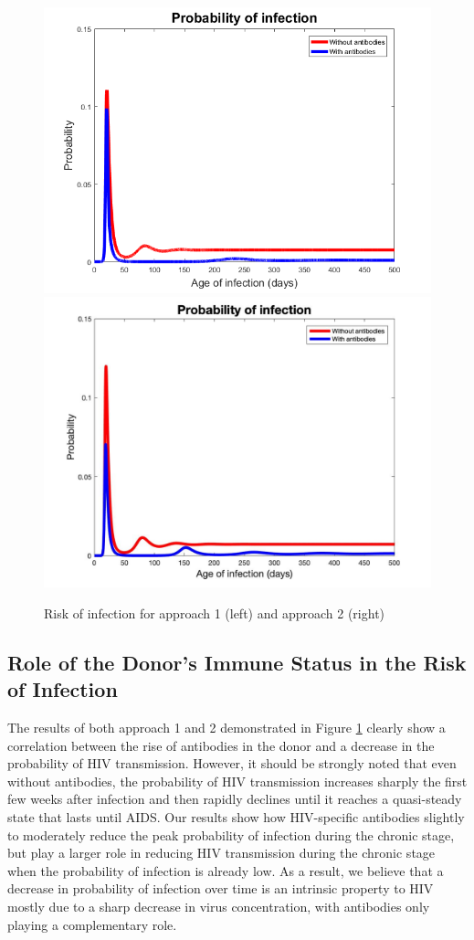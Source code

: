 \documentclass[]{elsarticle}
\theoremstyle{definition}
\begin{document}
\begin{figure}[H]
	\centering
		\includegraphics[width=.49\linewidth]{medianpinf.png}
		\includegraphics[width=.5\linewidth]{pinf2.jpg}
    \caption{Risk of infection for approach 1 (left) and approach 2 (right)}
	\label{Pinfplot}
\end{figure}

\subsection{Role of the Donor's Immune Status in the Risk of Infection}

The results of both approach 1 and 2 demonstrated in Figure \ref{Pinfplot} clearly show a correlation between the rise of antibodies in the donor and a decrease in the probability of HIV transmission. However, it should be strongly noted that even without antibodies, the probability of HIV transmission increases sharply the first few weeks after infection and then rapidly declines until it reaches a quasi-steady state that lasts until AIDS. Our results show how HIV-specific antibodies slightly to moderately reduce the peak probability of infection during the chronic stage, but play a larger role in reducing HIV transmission during the chronic stage when the probability of infection is already low. As a result, we believe that a decrease in probability of infection over time is an intrinsic property to HIV mostly due to a sharp decrease in virus concentration, with antibodies only playing a complementary role.
\end{document}

